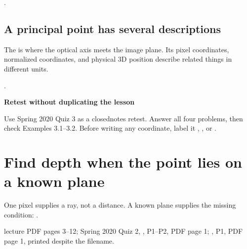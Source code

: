 \documentclass[letterpaper,11pt,english,openany,oneside]{jupyterBook}
\begin{document}
\sphinxAtStartPar
{} {\hyperref[\detokenize{lectures/lecture03/quiz-workbook:quiz-10-q1}]{}}.


\subsection{A principal point has several descriptions}
\label{\detokenize{lectures/lecture03/calibration:a-principal-point-has-several-descriptions}}
\sphinxAtStartPar
The  is where the optical axis meets the image plane. Its pixel coordinates, normalized coordinates, and physical 3D position describe related things in different units.

\sphinxAtStartPar
{} {\hyperref[\detokenize{lectures/lecture03/quiz-workbook:quiz-10-q3}]{}}.

\begin{TextbookBox}
\textbf{Retest without duplicating the lesson}\par\smallskip

\sphinxAtStartPar
Use Spring 2020 Quiz 3 as a closed\sphinxhyphen{}notes retest. Answer all four problems, then check Examples 3.1–3.2. Before writing any coordinate, label it , , or .

\end{TextbookBox}

\sphinxstepscope


\section{Find depth when the point lies on a known plane}
\label{\detokenize{lectures/lecture03/ray-plane:find-depth-when-the-point-lies-on-a-known-plane}}\label{\detokenize{lectures/lecture03/ray-plane:lec03-ray-plane}}\label{\detokenize{lectures/lecture03/ray-plane::doc}}
\sphinxAtStartPar
One pixel supplies a ray, not a distance. A known plane supplies the missing condition: .

\sphinxAtStartPar
{} lecture PDF pages 3–12; Spring 2020 Quiz 2, , P1–P2, PDF page 1; , P1, PDF page 1, printed  despite the filename.
\end{document}
